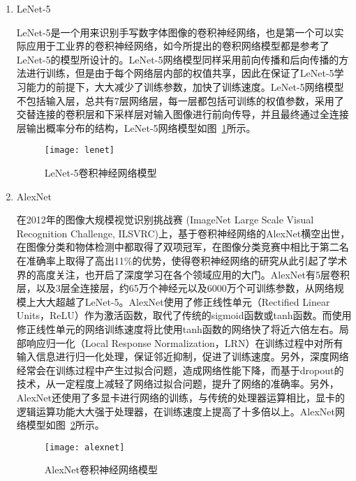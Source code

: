 \begin{enumerate}
\item LeNet-5\cite{lecun1998gradient}

LeNet-5是一个用来识别手写数字体图像的卷积神经网络，也是第一个可以实际应用于工业界的卷积神经网络，如今所提出的卷积网络模型都是参考了LeNet-5的模型所设计的。LeNet-5网络模型同样采用前向传播和后向传播的方法进行训练，但是由于每个网络层内部的权值共享，因此在保证了LeNet-5学习能力的前提下，大大减少了训练参数，加快了训练速度。LeNet-5网络模型不包括输入层，总共有7层网络层，每一层都包括可训练的权值参数，采用了交替连接的卷积层和下采样层对输入图像进行前向传导，并且最终通过全连接层输出概率分布的结构，LeNet-5网络模型如图~\ref{fig:lenet}所示。

\begin{figure}[H] %
  \centering
  \texttt{[image: lenet]}
  \caption{LeNet-5卷积神经网络模型}
  \label{fig:lenet}
\end{figure}


\item AlexNet\cite{krizhevsky2012imagenet}

在2012年的图像大规模视觉识别挑战赛 (ImageNet Large Scale Visual Recognition Challenge, ILSVRC)上，基于卷积神经网络的AlexNet横空出世，在图像分类和物体检测中都取得了双项冠军，在图像分类竞赛中相比于第二名在准确率上取得了高出11\%的优势，使得卷积神经网络的研究从此引起了学术界的高度关注，也开启了深度学习在各个领域应用的大门。AlexNet有5层卷积层，以及3层全连接层，约65万个神经元以及6000万个可训练参数，从网络规模上大大超越了LeNet-5。AlexNet使用了修正线性单元（Rectified Linear Units，ReLU）作为激活函数，取代了传统的sigmoid函数或tanh函数。而使用修正线性单元的网络训练速度将比使用tanh函数的网络快了将近六倍左右。局部响应归一化（Local Response Normalization，LRN）在训练过程中对所有输入信息进行归一化处理，保证邻近抑制，促进了训练速度。另外，深度网络经常会在训练过程中产生过拟合问题，造成网络性能下降，而基于dropout的技术，从一定程度上减轻了网络过拟合问题，提升了网络的准确率。另外，AlexNet还使用了多显卡进行网络的训练，与传统的处理器运算相比，显卡的逻辑运算功能大大强于处理器，在训练速度上提高了十多倍以上。AlexNet网络模型如图~\ref{fig:alexnet}所示。

\begin{figure}[H] %
  \centering
  \texttt{[image: alexnet]}
  \caption{AlexNet卷积神经网络模型}
  \label{fig:alexnet}
\end{figure}


\end{enumerate}
